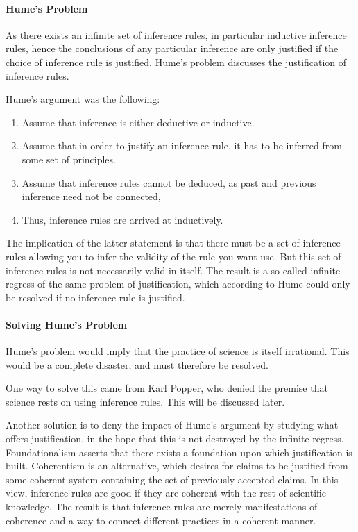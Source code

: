 \paragraph{Hume's Problem}
As there exists an infinite set of inference rules, in particular inductive inference rules, hence the conclusions of any particular inference are only justified if the choice of inference rule is justified. Hume's problem discusses the justification of inference rules.

Hume's argument was the following:
\begin{enumerate}
	\item Assume that inference is either deductive or inductive.
	\item Assume that in order to justify an inference rule, it has to be inferred from some set of principles.
	\item Assume that inference rules cannot be deduced, as past and previous inference need not be connected,
	\item Thus, inference rules are arrived at inductively.
\end{enumerate}
The implication of the latter statement is that there must be a set of inference rules allowing you to infer the validity of the rule you want use. But this set of inference rules is not necessarily valid in itself. The result is a so-called infinite regress of the same problem of justification, which according to Hume could only be resolved if no inference rule is justified.

\paragraph{Solving Hume's Problem}
Hume's problem would imply that the practice of science is itself irrational. This would be a complete disaster, and must therefore be resolved.

One way to solve this came from Karl Popper, who denied the premise that science rests on using inference rules. This will be discussed later.

Another solution is to deny the impact of Hume's argument by studying what offers justification, in the hope that this is not destroyed by the infinite regress. Foundationalism asserts that there exists a foundation upon which justification is built. Coherentism is an alternative, which desires for claims to be justified from some coherent system containing the set of previously accepted claims. In this view, inference rules are good if they are coherent with the rest of scientific knowledge. The result is that inference rules are merely manifestations of coherence and a way to connect different practices in a coherent manner.

